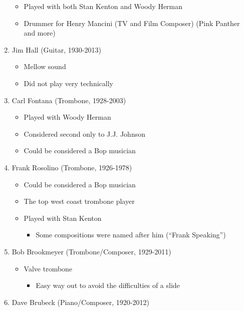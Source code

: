 \documentclass[]{article}
\providecommand{\tightlist}{%
  \setlength{\itemsep}{0pt}\setlength{\parskip}{0pt}}
\begin{document}
\begin{enumerate}
  \begin{itemize}
  \tightlist
  \item
    Played with both Stan Kenton and Woody Herman
  \item
    Drummer for Henry Mancini (TV and Film Composer) (Pink Panther and
    more)
  \end{itemize}
\item
  Jim Hall (Guitar, 1930-2013)

  \begin{itemize}
  \tightlist
  \item
    Mellow sound
  \item
    Did not play very technically
  \end{itemize}
\item
  Carl Fontana (Trombone, 1928-2003)

  \begin{itemize}
  \tightlist
  \item
    Played with Woody Herman
  \item
    Considered second only to J.J. Johnson
  \item
    Could be considered a Bop musician
  \end{itemize}
\item
  Frank Rosolino (Trombone, 1926-1978)

  \begin{itemize}
  \tightlist
  \item
    Could be considered a Bop musician
  \item
    The top west coast trombone player
  \item
    Played with Stan Kenton

    \begin{itemize}
    \tightlist
    \item
      Some compositions were named after him (``Frank Speaking'')
    \end{itemize}
  \end{itemize}
\item
  Bob Brookmeyer (Trombone/Composer, 1929-2011)

  \begin{itemize}
  \tightlist
  \item
    Valve trombone

    \begin{itemize}
    \tightlist
    \item
      Easy way out to avoid the difficulties of a slide
    \end{itemize}
  \end{itemize}
\item
  Dave Brubeck (Piano/Composer, 1920-2012)


\end{enumerate}
\end{document}
